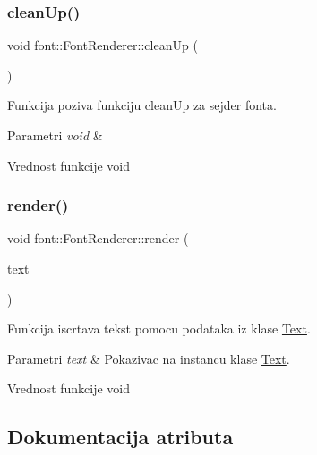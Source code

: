 \subsubsection{\texorpdfstring{clean\+Up()}{cleanUp()}}
{\footnotesize\ttfamily void font\+::\+Font\+Renderer\+::clean\+Up (\begin{DoxyParamCaption}\item[{void}]{ }\end{DoxyParamCaption})}



Funkcija poziva funkciju clean\+Up za sejder fonta. 


\begin{DoxyParams}{Parametri}
{\em void} & \\
\hline
\end{DoxyParams}
\begin{DoxyReturn}{Vrednost funkcije}
void 
\end{DoxyReturn}
\mbox{\label{classfont_1_1FontRenderer_adc45aa765d978d8b445c7e8f2eb5c90a}} 
\subsubsection{\texorpdfstring{render()}{render()}}
{\footnotesize\ttfamily void font\+::\+Font\+Renderer\+::render (\begin{DoxyParamCaption}\item[{\hyperlink{classfont_1_1Text}{Text} $\ast$}]{text }\end{DoxyParamCaption})}



Funkcija iscrtava tekst pomocu podataka iz klase \hyperlink{classfont_1_1Text}{Text}. 


\begin{DoxyParams}{Parametri}
{\em text} & Pokazivac na instancu klase \hyperlink{classfont_1_1Text}{Text}. \\
\hline
\end{DoxyParams}
\begin{DoxyReturn}{Vrednost funkcije}
void 
\end{DoxyReturn}


\subsection{Dokumentacija atributa}
\mbox{\label{classfont_1_1FontRenderer_ac53abacecd3c69c963e481ba7af5041b}} 
